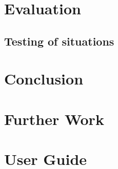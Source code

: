 \documentclass{article}
\begin{document}
\section{Evaluation}
\subsection{Testing of situations}






\section{Conclusion}
\section{Further Work}
\section{User Guide}
\end{document}

